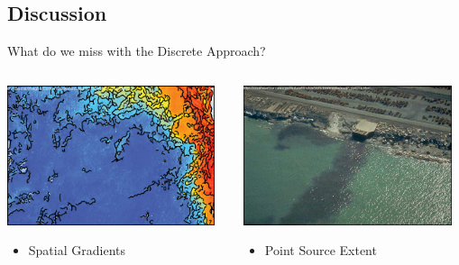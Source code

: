 \documentclass[compress,noflama,nosectionpages]{beamer}
\begin{document}
\subsection{Discussion}
\begin{frame}{What do we miss with the Discrete Approach?}
\vspace{8pt}
	\begin{columns}
		\begin{column}[c]{6cm}
	  	\includegraphics[height=4.1cm,clip=true,trim = 0mm 0mm 0mm 0mm,keepaspectratio=true]{images/scipy_border.png}%
	  	\vspace{3pt}
	  	\begin{itemize}
	  		\item{Spatial Gradients}
	  	\end{itemize}
		\end{column}
		\begin{column}[c]{6cm}
			\includegraphics[height=4.1cm,keepaspectratio=true]{images/pointsource_border.png}%
			\vspace{3pt}
			\begin{itemize}
	  		\item{Point Source Extent}
	  	\end{itemize}
		\end{column}
	\end{columns}
     
\end{frame}
\end{document}
